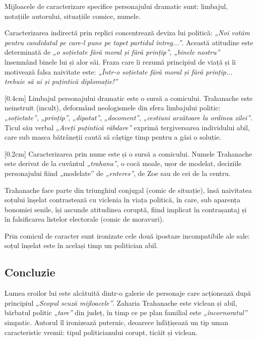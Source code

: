 Mijloacele de caracterizare specifice personajului dramatic sunt: limbajul, notațiile autorului, situațiile comice, numele.

Caracterizarea indirectă prin replici concentrează deviza lui politică: \textit{„Noi votăm pentru candidatul pe care-l pune pe tapet partidul întreg...”}. Această atitudine este determinată de \textit{„o soțietate fără moral și fără prințip”}, \textit{„binele nostru”} însemnând binele lui și alor săi. Fraza care îi rezumă principiul de viață și îi motivează falsa naivitate este: \textit{„Într-o soțietate fără moral și fără prințip... trebuie să ai și puțintică diplomație!”}

[0.4cm]
Limbajul personajului dramatic este o sursă a comicului. Trahanache este neinstruit (incult), deformând neologismele din sfera limbajului politic: \textit{„soțietate”}, \textit{„prințip”}, \textit{„dipotat”}, \textit{„docoment”}, \textit{„cestiuni arzătoare la ordinea zilei”}. Ticul său verbal \textit{„Aveți puțintică răbdare”} exprimă tergiversarea individului abil, care sub masca bătrâneții caută să câștige timp pentru a găsi o soluție.

[0.2cm]
Caracterizarea prin nume este și o sursă a comicului. Numele Trahanache este derivat de la cuvântul \textit{„trahana”}, o cocă moale, ușor de modelat, deciziile personajului fiind „modelate” de \textit{„enteres”}, de Zoe sau de cei de la centru.

Trahanache face parte din triunghiul conjugal (comic de situație), însă naivitatea soțului înșelat contrastează cu viclenia în viața politică, în care, sub aparența bonomiei senile, își ascunde atitudinea coruptă, fiind implicat în contrașantaj și în falsificarea listelor electorale (comic de moravuri).

Prin comicul de caracter sunt ironizate cele două ipostaze incompatibile ale sale: soțul înșelat este în același timp un politician abil.

\subsection{Concluzie}

Lumea eroilor lui \operaauthor este alcătuită dintr-o galerie de personaje care acționează după principiul \textit{„Scopul scuză mijloacele”}. Zaharia Trahanache este viclean și abil, bărbatul politic \textit{„tare”} din județ, în timp ce pe plan familial este \textit{„încornoratul”} simpatic. Autorul îl ironizează puternic, deoarece înfățișează un tip uman caracteristic vremii: tipul politicianului corupt, ticăit și viclean.

